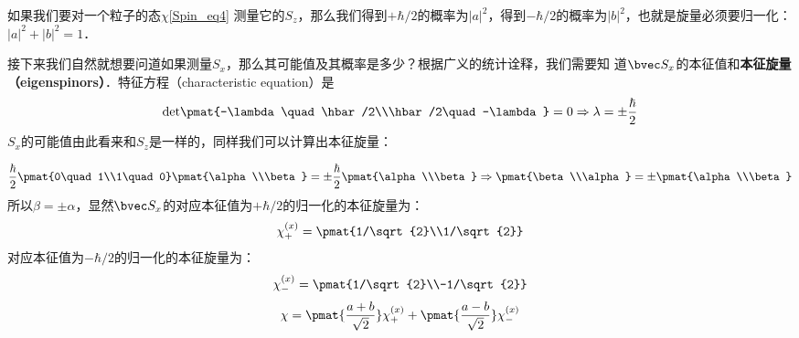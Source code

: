 如果我们要对一个粒子的态$\chi$\autoref{Spin_eq4} 测量它的$S_z$，那么我们得到$+\hbar/2$的概率为$|a|^2$，得到$-\hbar/2$的概率为$|b|^2$，也就是旋量必须要归一化：$|a|^2+ |b|^2 = 1$．

接下来我们自然就想要问道如果测量$S_x$，那么其可能值及其概率是多少？根据广义的统计诠释，我们需要知
道$\bvec S_x$的本征值和\textbf{本征旋量（eigenspinors）}．特征方程（characteristic equation）是
\begin{equation}
\rm{det}\pmat{-\lambda \quad \hbar/2\\\hbar/2\quad -\lambda}=0\Rightarrow\lambda=\pm\frac{\hbar}{2}
\end{equation}
$S_x$的可能值由此看来和$S_z$是一样的，同样我们可以计算出本征旋量：

\begin{equation}
\frac{\hbar}{2}\pmat{0\quad 1\\1\quad0}\pmat{\alpha\\\beta}=\pm\frac{\hbar}{2}\pmat{\alpha\\\beta} \Rightarrow \pmat{\beta\\\alpha}=\pm\pmat{\alpha\\\beta}
\end{equation}
所以$\beta=\pm\alpha$，显然$\bvec S_x$的对应本征值为$+\hbar/2$的归一化的本征旋量为：
\begin{equation}\label{Spin_eq5}
\chi_+^{(x)}=\pmat{1/\sqrt{2}\\1/\sqrt{2}}
\end{equation}
对应本征值为$-\hbar/2$的归一化的本征旋量为：
\begin{equation}\label{Spin_eq6}
\chi_-^{(x)}=\pmat{1/\sqrt{2}\\-1/\sqrt{2}}
\end{equation}
\begin{equation}
\chi = \pmat{\frac{a+b}{\sqrt{2}}}\chi_+^{(x)}+\pmat{\frac{a-b}{\sqrt{2}}}\chi_-^{(x)}
\end{equation}
